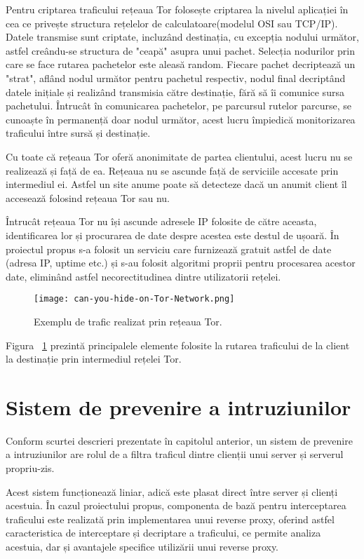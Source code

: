   
Pentru criptarea traficului rețeaua Tor folosește criptarea la nivelul aplicației în cea ce privește structura rețelelor de calculatoare(modelul OSI sau TCP/IP). Datele transmise sunt criptate, incluzând destinația, cu excepția nodului următor, astfel creându-se structura de "ceapă" asupra unui pachet. Selecția nodurilor prin care se face rutarea pachetelor este aleasă random. Fiecare pachet decriptează un "strat", aflând nodul următor pentru pachetul respectiv, nodul final decriptând datele inițiale și realizând transmisia către destinație, fără să îi comunice sursa pachetului. Întrucât în comunicarea pachetelor, pe parcursul rutelor parcurse, se cunoaște în permanență doar nodul următor, acest lucru împiedică monitorizarea traficului între sursă și destinație. 


Cu toate că rețeaua Tor oferă anonimitate de partea clientului, acest lucru nu se realizează și față de ea. Rețeaua nu se ascunde față de serviciile accesate prin intermediul ei. Astfel un site anume poate să detecteze dacă un anumit client îl accesează folosind rețeaua Tor sau nu. 

Întrucât rețeaua Tor nu își ascunde adresele IP folosite de către aceasta, identificarea lor și procurarea de date despre acestea este destul de ușoară. În proiectul propus s-a folosit un serviciu care furnizează gratuit astfel de date \cite{tot_status}(adresa IP, uptime etc.) și s-au folosit algoritmi proprii pentru procesarea acestor date, eliminând astfel necorectitudinea dintre utilizatorii rețelei. 

\begin{figure}[h]
	\centering
	\texttt{[image: can-you-hide-on-Tor-Network.png]}
	\caption{ Exemplu de trafic realizat prin rețeaua Tor. }
	\label{fig:tor-example}
\end{figure}

Figura ~\ref{fig:tor-example}  prezintă principalele elemente folosite la rutarea traficului de la client la destinație prin intermediul rețelei Tor. \\


\section{Sistem de prevenire a intruziunilor}
Conform scurtei descrieri prezentate în capitolul anterior, un sistem de prevenire a intruziunilor are rolul de a filtra traficul dintre clienții unui server și serverul propriu-zis. 

Acest sistem funcționează liniar, adică este plasat direct între server și clienți acestuia. În cazul proiectului propus, componenta de bază pentru interceptarea traficului este realizată prin implementarea unui reverse proxy, oferind astfel caracteristica de interceptare și decriptare a traficului, ce permite analiza acestuia, dar și avantajele specifice utilizării unui reverse proxy. 

